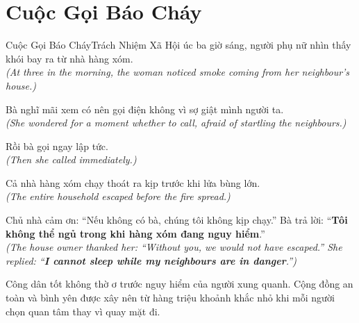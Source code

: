 \section{Cuộc Gọi Báo Cháy}
\begin{truyen}{Cuộc Gọi Báo Cháy}{Trách Nhiệm Xã Hội}
úc ba giờ sáng, người phụ nữ nhìn thấy khói bay ra từ nhà hàng xóm.\\
\textit{(At three in the morning, the woman noticed smoke coming from her neighbour's house.)}

Bà nghĩ mãi xem có nên gọi điện không vì sợ giật mình người ta.\\
\textit{(She wondered for a moment whether to call, afraid of startling the neighbours.)}

Rồi bà gọi ngay lập tức.\\
\textit{(Then she called immediately.)}

Cả nhà hàng xóm chạy thoát ra kịp trước khi lửa bùng lớn.\\
\textit{(The entire household escaped before the fire spread.)}

Chủ nhà cảm ơn: ``Nếu không có bà, chúng tôi không kịp chạy.'' Bà trả lời: ``\textbf{Tôi không thể ngủ trong khi hàng xóm đang nguy hiểm}.''\\
\textit{(The house owner thanked her: ``Without you, we would not have escaped.'' She replied: ``\textbf{I cannot sleep while my neighbours are in danger}.'')}
\end{truyen}
\begin{baihoc}
  Công dân tốt không thờ ơ trước nguy hiểm của người xung quanh. Cộng đồng an toàn và bình yên được xây nên từ hàng triệu khoảnh khắc nhỏ khi mỗi người chọn quan tâm thay vì quay mặt đi.
\end{baihoc}

